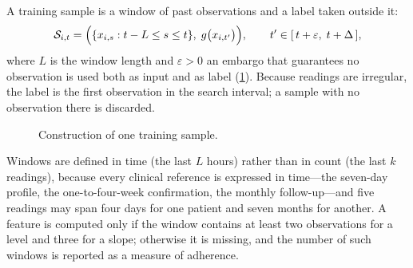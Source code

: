 A training sample is a window of past observations and a label taken outside it:
\begin{equation}
  \mathcal{S}_{i,t} = \Bigl( \{x_{i,s} : t - L \leq s \leq t\},\; g\bigl(x_{i,t'}\bigr) \Bigr),
  \qquad t' \in [\,t + \varepsilon,\; t + \Delta\,],
\end{equation}
where $L$ is the window length and $\varepsilon > 0$ an embargo that guarantees no observation is used both as input and as label (\cref{fig:window-embargo}). Because readings are irregular, the label is the first observation in the search interval; a sample with no observation there is discarded.

\begin{figure}[htbp]
\centering
{}
\caption{Construction of one training sample.}\label{fig:window-embargo}
\end{figure}

Windows are defined in time (the last $L$ hours) rather than in count (the last $k$ readings), because every clinical reference is expressed in time---the seven-day profile, the one-to-four-week confirmation, the monthly follow-up---and five readings may span four days for one patient and seven months for another. A feature is computed only if the window contains at least two observations for a level and three for a slope; otherwise it is missing, and the number of such windows is reported as a measure of adherence.

